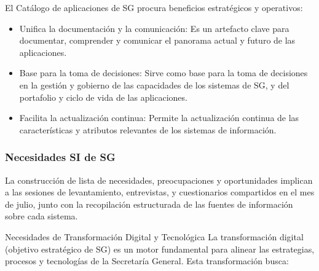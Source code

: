 \documentclass[
	a4paper, %
	12pt, %
]{include/CSSullivanBusinessReport}
\def\tightlist{}
\begin{document}
El Catálogo de aplicaciones de SG procura beneficios estratégicos y
operativos:

\begin{itemize}
\tightlist
\item
  Unifica la documentación y la comunicación: Es un artefacto clave para
  documentar, comprender y comunicar el panorama actual y futuro de las
  aplicaciones.
\item
  Base para la toma de decisiones: Sirve como base para la toma de
  decisiones en la gestión y gobierno de las capacidades de los sistemas
  de SG, y del portafolio y ciclo de vida de las aplicaciones.
\item
  Facilita la actualización continua: Permite la actualización continua
  de las características y atributos relevantes de los sistemas de
  información.
\end{itemize}

\subsubsection{Necesidades SI de SG}\label{sec:necesidades-si-de-sg}

La construcción de lista de necesidades, preocupaciones y oportunidades
implican a las sesiones de levantamiento, entrevistas, y cuestionarios
compartidos en el mes de julio, junto con la recopilación estructurada
de las fuentes de información sobre cada sistema.

Necesidades de Transformación Digital y Tecnológica La transformación
digital (objetivo estratégico de SG) es un motor fundamental para
alinear las estrategias, procesos y tecnologías de la Secretaría
General. Esta transformación busca:
\end{document}
